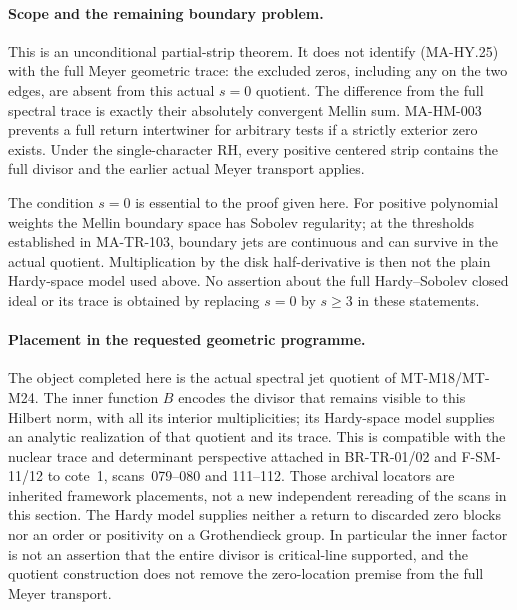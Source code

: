 \paragraph{Scope and the remaining boundary problem.}
This is an unconditional partial-strip theorem.  It does
not identify (MA-HY.25) with the full Meyer geometric trace:
the excluded zeros, including any on the two edges, are
absent from this actual $s=0$ quotient.  The difference from
the full spectral trace is exactly their absolutely
convergent Mellin sum.  MA-HM-003 prevents a full return
intertwiner for arbitrary tests if a strictly exterior
zero exists.  Under the single-character RH, every positive
centered strip contains the full divisor and the earlier
actual Meyer transport applies.

The condition $s=0$ is essential to the proof given here.
For positive polynomial weights the Mellin boundary space
has Sobolev regularity; at the thresholds established in
MA-TR-103, boundary jets are continuous and can survive in
the actual quotient.  Multiplication by the disk
half-derivative is then not the plain Hardy-space model
used above.  No assertion about the full Hardy--Sobolev
closed ideal or its trace is obtained by replacing $s=0$
by $s\ge3$ in these statements.

\paragraph{Placement in the requested geometric programme.}
The object completed here is the actual spectral jet quotient
of MT-M18/MT-M24.  The inner function $B$ encodes the divisor
that remains visible to this Hilbert norm, with all its interior
multiplicities; its Hardy-space model supplies an analytic
realization of that quotient and its trace.  This is compatible
with the nuclear trace and determinant perspective attached in
BR-TR-01/02 and F-SM-11/12 to cote~1, scans~079--080 and
111--112.  Those archival locators are inherited framework
placements, not a new independent rereading of the scans in
this section.  The Hardy model supplies neither a return to
discarded zero blocks nor an order or positivity on a
Grothendieck group.  In particular the inner factor is not an
assertion that the entire divisor is critical-line supported,
and the quotient construction does not remove the
zero-location premise from the full Meyer transport.

